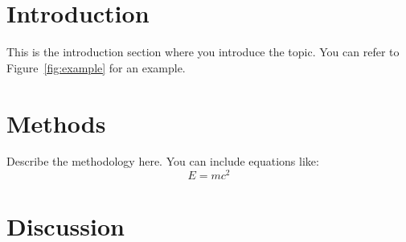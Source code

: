 \documentclass[a4paper,12pt]{article}
\begin{document}

	
	
	\section{Introduction}
	This is the introduction section where you introduce the topic. 
	You can refer to Figure~\ref{fig:example} for an example.
	
	

	
	\section{Methods}
	Describe the methodology here. You can include equations like:
	\begin{equation}
		E = mc^2
	\end{equation}
	
	\section{Discussion}
	
\end{document}
